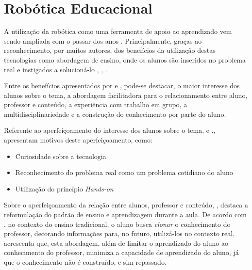 \section{Robótica Educacional} %
\label{sec:robótica_educacional}

A utilização da robótica como uma ferramenta de apoio ao aprendizado vem sendo ampliada com o passar dos anos \cite{teachingWithRoboticKit}. Principalmente, graças ao reconhecimento, por muitos autores, dos benefícios da utilização destas tecnologias como abordagem de ensino, onde os alunos são inseridos no problema real e instigados a solucioná-lo \cite{teachingWithRoboticKit}, \cite{construcionismoPapert}, \cite{roboticaEducativaEnsinoMedio}.

Entre os benefícios apresentados por \cite{daMaquinaDeEnsinarAMaquinaDeAprender} e \cite{PCsEConstrucionismo}, pode-se destacar, o maior interesse dos alunos sobre o tema, a abordagem facilitadora para o relacionamento entre aluno, professor e conteúdo, a experiência com trabalho em grupo, a multidisciplinariedade e a construção do conhecimento por parte do aluno.

Referente ao aperfeiçoamento do interesse dos alunos sobre o tema, \cite{construcionismoPapert} e \cite{teachingWithRoboticKit}., apresentam motivos deste aperfeiçoamento, como:
\begin{itemize}
	\item Curiosidade sobre a tecnologia

	\item Reconhecimento do problema real como um problema cotidiano do aluno

	\item Utilização do princípio \textit{Hands-on} \cite{PCsEConstrucionismo}
\end{itemize}

Sobre o aperfeiçoamento da relação entre alunos, professor e conteúdo, \cite{construcionismoPapert}, destaca a reformulação do padrão de ensino e aprendizagem durante a aula. De acordo com \cite{construcionismoPapert}, no contexto do ensino tradicional, o aluno busca \textit{clonar} o conhecimento do professor, decorando informações para, no futuro, utilizá-los no contexto real. \cite{roboticaEducativaEnsinoMedio} acrescenta que, esta abordagem, além de limitar o aprendizado do aluno ao conhecimento do professor, minimiza a capacidade de aprendizado do aluno, já que o conhecimento não é construído, e sim repassado.

